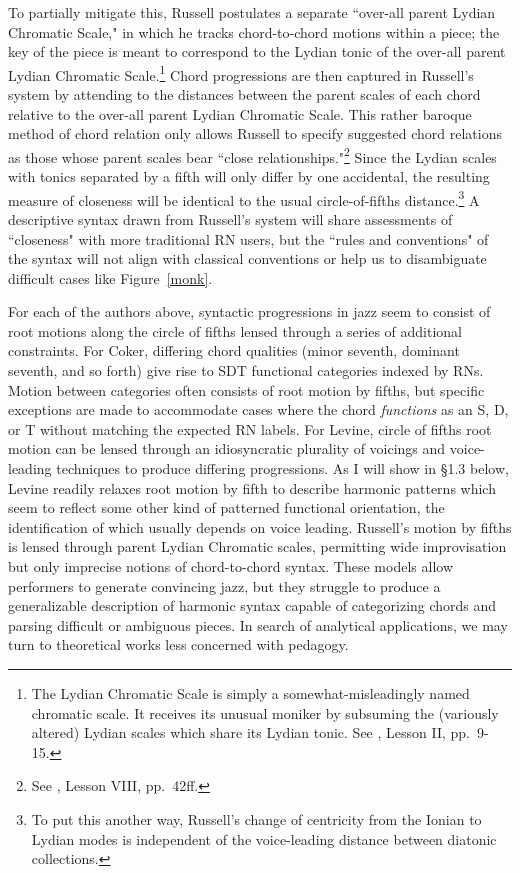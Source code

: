 To partially mitigate this, Russell postulates a separate ``over-all parent Lydian Chromatic Scale," in which he tracks chord-to-chord motions within a piece; the key of the piece is meant to correspond to the Lydian tonic of the over-all parent Lydian Chromatic Scale.\footnote{The Lydian Chromatic Scale is simply a somewhat-misleadingly named chromatic scale.  It receives its unusual moniker by subsuming the (variously altered) Lydian scales which share its Lydian tonic.  See \cite{russell1953}, Lesson II, pp.\ 9-15.}  Chord progressions are then captured in Russell's system by attending to the distances between the parent scales of each chord relative to the over-all parent Lydian Chromatic Scale.  This rather baroque method of chord relation only allows Russell to specify suggested chord relations as those whose parent scales bear ``close relationships."\footnote{See \cite{russell1953}, Lesson VIII, pp.\ 42ff.}  Since the Lydian scales with tonics separated by a fifth will only differ by one accidental, the resulting measure of closeness will be identical to the usual circle-of-fifths distance.\footnote{To put this another way, Russell's change of centricity from the Ionian to Lydian modes is independent of the voice-leading distance between diatonic collections.}  A descriptive syntax drawn from Russell's system will share assessments of ``closeness" with more traditional RN users, but the ``rules and conventions" of the syntax will not align with classical conventions or help us to disambiguate difficult cases like Figure~\ref{monk}.

For each of the authors above, syntactic progressions in jazz seem to consist of root motions along the circle of fifths lensed through a series of additional constraints.  For Coker, differing chord qualities (minor seventh, dominant seventh, and so forth) give rise to SDT functional categories indexed by RNs.  Motion between categories often consists of root motion by fifths, but specific exceptions are made to accommodate cases where the chord \emph{functions} as an S, D, or T without matching the expected RN labels.  For Levine, circle of fifths root motion can be lensed through an idiosyncratic plurality of voicings and voice-leading techniques to produce differing progressions.  As I will show in \S 1.3 below, Levine readily relaxes root motion by fifth to describe harmonic patterns which seem to reflect some other kind of patterned functional orientation, the identification of which usually depends on voice leading.  Russell's motion by fifths is lensed through parent Lydian Chromatic scales, permitting wide improvisation but only imprecise notions of chord-to-chord syntax.  These models allow performers to generate convincing jazz, but they struggle to produce a generalizable description of harmonic syntax capable of categorizing chords and parsing difficult or ambiguous pieces.  In search of analytical applications, we may turn to theoretical works less concerned with pedagogy.

